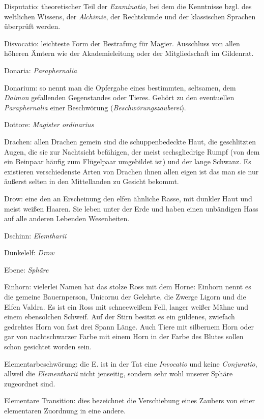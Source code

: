 \documentclass[a5paper,8pt]{book}
\begin{document}
\begin{small}
\begin{description}
 \item Disputatio: theoretischer Teil der \textit{Examinatio}, bei dem die Kenntnisse bzgl. des weltlichen Wissens, der \textit{Alchimie}, der Rechtskunde und der klassischen Sprachen überprüft werden.
 \item Disvocatio: leichteste Form der Bestrafung für Magier. Ausschluss von allen höheren Ämtern wie der Akademieleitung oder der Mitgliedschaft im Gildenrat.
 \item Donaria: \textit{Paraphernalia}
 \item Donarium: so nennt man die Opfergabe eines bestimmten, seltsamen, dem \textit{Daimon} gefallenden Gegenstandes oder Tieres. Gehört zu den eventuellen
\textit{Paraphernalia} einer Beschwörung (\textit{Beschwörungs­zauberei}).
\item Dottore: \textit{Magister ordinarius}
 \item Drachen: allen Drachen gemein sind die schuppenbedeckte Haut, die geschlitzten Augen, die sie zur Nachtsicht befähigen, der meist sechsgliedrige Rumpf (von dem ein Beinpaar häufig zum Flügelpaar umgebildet ist) und der lange Schwanz. Es existieren verschiedenste Arten von Drachen ihnen allen eigen ist das man sie nur äußerst selten in den Mittellanden zu Gesicht bekommt. 
 \item Drow: eine den an Erscheinung den elfen ähnliche Rasse, mit dunkler Haut und meist weißen Haaren. Sie leben unter der Erde und haben einen unbändigen Hass auf alle anderen Lebenden Wesenheiten.
 \item Dschinn: \textit{Elemtharii}
 \item Dunkelelf: \textit{Drow}
 \item Ebene: \textit{Sphäre}
 \item Einhorn: vielerlei Namen hat das stolze Ross mit dem Horne: Einhorn nennt es die gemeine Bauernperson, Unicornu der Gelehrte, die Zwerge Ligorn und die Elfen Valdra. Es ist ein Ross mit schneeweißem Fell, langer weißer Mähne und einem ebensolchen Schweif. Auf der Stirn besitzt es ein güldenes, zwiefach gedrehtes Horn von fast drei Spann Länge. Auch Tiere mit silbernem Horn oder gar von nachtschwarzer Farbe mit einem Horn in der Farbe des Blutes sollen schon gesichtet worden sein.
 \item Elementarbeschwörung: die E. ist in der Tat eine \textit{Invocatio} und keine \textit{Conjuratio}, allweil die \textit{Elementharii} nicht jenseitig, sondern sehr
wohl unserer Sphäre zugeordnet sind.
 \item Elementare Transition: dies bezeichnet die Ver­schiebung eines Zaubers von einer elementaren Zu­ordnung in eine andere.

\end{description}
\end{small}
\end{document}
